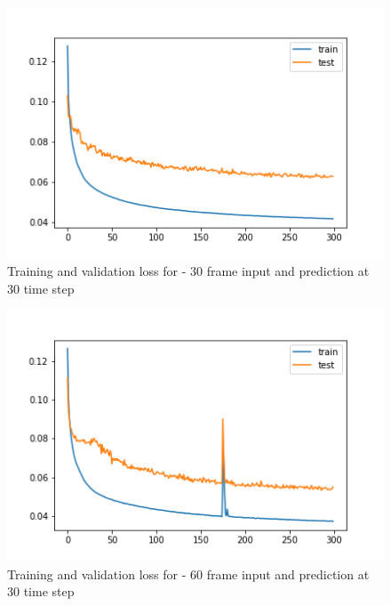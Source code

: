 \begin{figure}[H] \label{30-30}
\includegraphics[scale=0.8]{conf10_300e_30ffuture}
\begin{center}
\caption{Training and validation loss for - 30 frame input and prediction at 30 time step }
\end{center}
\end{figure}

\begin{figure}[H] \label{60-30}
\includegraphics[scale=0.8]{conf11_300e_60_30ffuture}
\begin{center}
\caption{Training and validation loss for - 60 frame input and prediction at 30 time step }
\end{center}
\end{figure}

